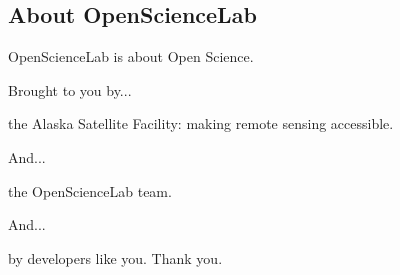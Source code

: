 \subsection{About OpenScienceLab}

OpenScienceLab is about Open Science.

Brought to you by...

the Alaska Satellite Facility: making remote sensing accessible.

And...

the OpenScienceLab team.

And...

by developers like you. Thank you.